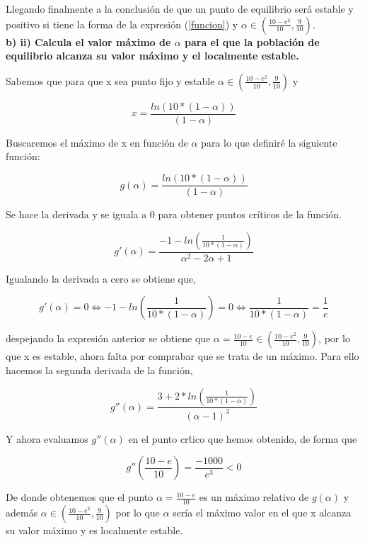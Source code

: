 \documentclass{article}
\begin{document}
Llegando finalmente a la conclusión de que un punto de equilibrio será estable y positivo si tiene la forma de la expresión (\ref{funcion}) y $\alpha \in (\frac{10 - e^2}{10}, \frac{9}{10})$. \\

\textbf{b) ii) Calcula el valor m\'aximo de $\alpha$ para el que la poblaci\'on de equilibrio alcanza su valor m\'aximo y el localmente estable.}

Sabemos que para que x sea punto fijo y estable $\alpha \in (\frac{10-e^2}{10},\frac{9}{10})$ y 

\begin{equation}
x=\frac{ln(10*(1-\alpha))}{(1-\alpha)}
\end{equation}

Buscaremos el m\'aximo de x en funci\'on de $\alpha$ para lo que definir\'e la siguiente funci\'on:

\begin{equation}
g(\alpha)=\frac{ln(10*(1-\alpha))}{(1-\alpha)}
\end{equation}

Se hace la derivada y se iguala a 0 para obtener puntos cr\'iticos de la funci\'on.

\begin{equation}
g'(\alpha)=\frac{-1-ln(\frac{1}{10*(1-\alpha)})}{\alpha^2-2\alpha+1}
\end{equation}

Igualando la derivada a cero se obtiene que,

\begin{equation}
g'(\alpha)=0 \Longleftrightarrow -1-ln(\frac{1}{10*(1-\alpha)})=0 \Longleftrightarrow \frac{1}{10*(1-\alpha)} = \frac{1}{e}
\end{equation}

despejando la expresi\'on anterior se obtiene que $\alpha=\frac{10-e}{10} \in (\frac{10-e^2}{10}, \frac{9}{10})$, por lo que x es estable, ahora falta por comprabar que se trata de un m\'aximo. Para ello hacemos la segunda derivada de la funci\'on,

\begin{equation}
g''(\alpha)=\frac{3+2*ln(\frac{1}{10* (1-\alpha)})}{(\alpha-1)^3}
\end{equation}

Y ahora evaluamos $g''(\alpha)$ en el punto cr\'tico que hemos obtenido, de forma que 

\begin{equation}
g''(\frac{10-e}{10})=\frac{-1000}{e^3} < 0
\end{equation}

De donde obtenemos que el punto $\alpha=\frac{10-e}{10}$ es un m\'aximo relativo de $g(\alpha)$ y adem\'as $\alpha \in(\frac{10-e^2}{10},\frac{9}{10})$ por lo que $\alpha$ sería el máximo valor en el que x alcanza su valor máximo y es localmente estable.
\end{document}
